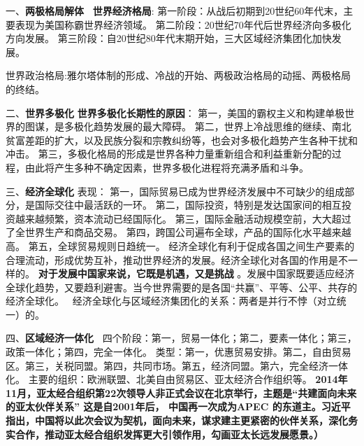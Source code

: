 {{一、}{\textbf{两极格局解体~}}
\textbf{{世界经济格局}}{:}
{第一阶段：从战后初期到20世纪60年代末，主要表现为美国称霸世界经济领域。}
{第二阶段：20世纪70年代后世界经济向多极化方向发展。}
{第三阶段：自20世纪80年代末期开始，三大区域经济集团化加快发展。~}
}

{世界政治格局:雅尔塔体制的形成、冷战的开始、两极政治格局的动摇、两极格局的终结。}

{{}
{二、}{\textbf{世界多极化}}
{\textbf{世界多极化长期性的原因}}{：}
{第一，美国的霸权主义和构建单极世界的图谋，是多极化趋势发展的最大障碍。}
{第二，世界上冷战思维的继续、南北贫富差距的扩大，以及民族分裂和宗教纠纷等，也会对多极化趋势产生各种干扰和冲击。}
{第三，多极化格局的形成是世界各种力量重新组合和利益重新分配的过程，由此将产生多种不确定因素，世界多极化进程将充满矛盾和斗争。}

{三、}{\textbf{经济全球化}}
{表现：}
{第一，国际贸易已成为世界经济发展中不可缺少的组成部分，是国际交往中最活跃的一环。}
{第二，国际投资，特别是发达国家间的相互投资越来越频繁，资本流动已经国际化。}
{第三，国际金融活动规模空前，大大超过了全世界生产和商品交易。}
{第四，跨国公司遍布全球，产品的国际化水平越来越高。}
{第五，全球贸易规则日趋统一。}
{经济全球化有利于促成各国之间生产要素的合理流动，形成优势互补，推动世界经济的发展。经济全球化对各国的作用是不一样的。}
{\textbf{对于发展中国家来说，它既是机遇，又是挑战}}
{。发展中国家既要适应经济全球化趋势，又要趋利避害。当今世界需要的是各国``共赢''、平等、公平、共存的经济全球化。~}
{经济全球化与区域经济集团化的关系}{：两者是并行不悖（对立统一）的。}



{四、}{\textbf{区域经济一体化~}}
{四个阶段：第一，贸易一体化；第二，要素一体化；第三，政策一体化；第四，完全一体化。}
{类型：第一，优惠贸易安排。第二，自由贸易区。第三，关税同盟。第四，共同市场。第五，经济同盟。第六，完全经济一体化。}
{主要的组织：欧洲联盟、北美自由贸易区、亚太经济合作组织等。}
\textbf{2014年11月，亚太经合组织第22次领导人非正式会议在北京举行，主题是``共建面向未来的亚太伙伴关系''
这是自2001年后， 中国再一次成为APEC
的东道主。习近平指出，中国将以此次会议为契机，面向未来，谋求建主更紧密的伙伴关系，深化务实合作，推动亚太经合组织发挥更大引领作用，勾画亚太长远发展愿景。）~~}}